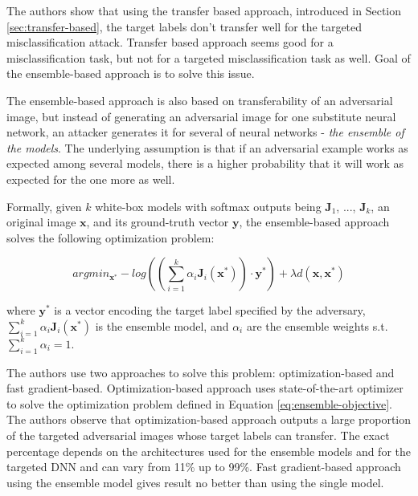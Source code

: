 The authors \cite{ensemble-attack} show that using the transfer based approach, introduced in Section \ref{sec:transfer-based}, the target labels don't transfer well for the targeted misclassification attack. Transfer based approach seems good for a misclassification task, but not for a targeted misclassification task as well. Goal of the ensemble-based approach is to solve this issue.

The ensemble-based approach is also based on transferability of an adversarial image, but instead of generating an adversarial image for one substitute neural network, an attacker generates it for several of neural networks - \textit{the ensemble of the models}. The underlying assumption is that if an adversarial example works as expected among several models, there is a higher probability that it will work as expected for the one more as well. 

Formally, given $k$ white-box models with softmax outputs being $\pmb J_1$, ..., $\pmb J_k$, an original image $\pmb x$, and its ground-truth vector $\pmb y$, the ensemble-based approach solves the following optimization problem:

\begin{equation}\label{eq:ensemble-objective}
argmin_{\pmb x^*} - log ((\sum_{i=1}^k \alpha_i \pmb J_i(\pmb x^*)) \cdot \pmb y^*) + \lambda d(\pmb x, \pmb x^*)
\end{equation}

where $\pmb y^*$ is a vector encoding the target label specified by the adversary, $\sum_{i=1}^k \alpha_i \pmb J_i(\pmb x^*)$ is the ensemble model, and $\alpha_i$ are the ensemble weights s.t. $\sum_{i=1}^k \alpha_i = 1$.

The authors use two approaches to solve this problem: optimization-based and fast gradient-based. Optimization-based approach uses state-of-the-art optimizer to solve the optimization problem defined in Equation \ref{eq:ensemble-objective}. The authors observe that optimization-based approach outputs a large proportion of the targeted adversarial images whose target labels can transfer. The exact percentage depends on the architectures used for the ensemble models and for the targeted DNN and can vary from 11\% up to 99\%. Fast gradient-based approach using the ensemble model gives result no better than using the single model.